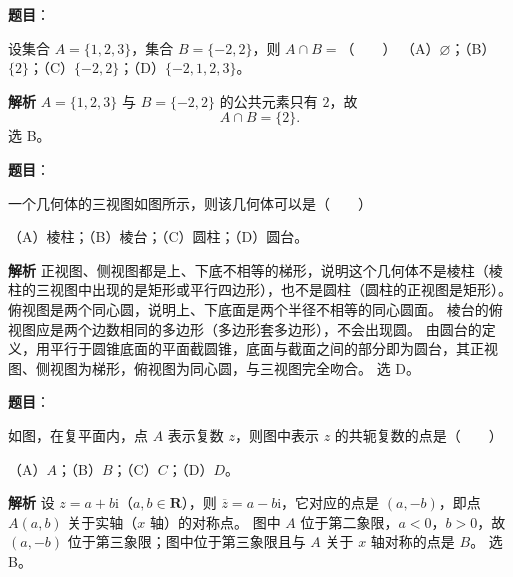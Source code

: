 
\begin{answer}

\textbf{题目}：

设集合 $A=\{1,2,3\}$，集合 $B=\{-2,2\}$，则 $A\cap B=$\mbox{（　　）}
（A）$\varnothing$；（B）$\{2\}$；（C）$\{-2,2\}$；（D）$\{-2,1,2,3\}$。

\textbf{解析}
$A=\{1,2,3\}$ 与 $B=\{-2,2\}$ 的公共元素只有 $2$，故
\nopagebreak[4]
\[A\cap B=\{2\}.\]
选 B。


\end{answer}
\begin{answer}

\textbf{题目}：

一个几何体的三视图如图所示，则该几何体可以是\mbox{（　　）}
\nopagebreak[4]
\begin{center}\end{center}
\nopagebreak[4]
（A）棱柱；（B）棱台；（C）圆柱；（D）圆台。

\textbf{解析}
正视图、侧视图都是上、下底不相等的梯形，说明这个几何体不是棱柱（棱柱的三视图中出现的是矩形或平行四边形），也不是圆柱（圆柱的正视图是矩形）。
俯视图是两个同心圆，说明上、下底面是两个半径不相等的同心圆面。
棱台的俯视图应是两个边数相同的多边形（多边形套多边形），不会出现圆。
由圆台的定义，用平行于圆锥底面的平面截圆锥，底面与截面之间的部分即为圆台，其正视图、侧视图为梯形，俯视图为同心圆，与三视图完全吻合。
选 D。


\end{answer}
\begin{answer}

\textbf{题目}：

如图，在复平面内，点 $A$ 表示复数 $z$，则图中表示 $z$ 的共轭复数的点是\mbox{（　　）}
\nopagebreak[4]
\begin{center}\end{center}
\nopagebreak[4]
（A）$A$；（B）$B$；（C）$C$；（D）$D$。

\textbf{解析}
设 $z=a+b\mathrm i$（$a,b\in\mathbf R$），则 $\overline z=a-b\mathrm i$，它对应的点是 $(a,-b)$，即点 $A(a,b)$ 关于实轴（$x$ 轴）的对称点。
图中 $A$ 位于第二象限，$a<0$，$b>0$，故 $(a,-b)$ 位于第三象限；图中位于第三象限且与 $A$ 关于 $x$ 轴对称的点是 $B$。
选 B。


\end{answer}
